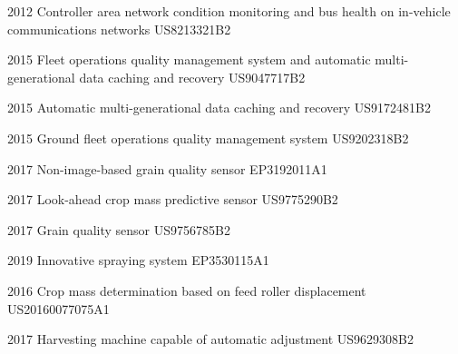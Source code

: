 

\begin{cvpatents}

  \cvpatent
    {2012} %
    {Controller area network condition monitoring and bus health on in-vehicle communications networks} %
    {US8213321B2} %

  \cvpatent
    {2015} %
    {Fleet operations quality management system and automatic multi-generational data caching and recovery} %
    {US9047717B2} %

  \cvpatent
    {2015} %
    {Automatic multi-generational data caching and recovery} %
    {US9172481B2} %

  \cvpatent
    {2015} %
    {Ground fleet operations quality management system} %
    {US9202318B2} %

  \cvpatent
    {2017} %
    {Non-image-based grain quality sensor} %
    {EP3192011A1} %

  \cvpatent
    {2017} %
    {Look-ahead crop mass predictive sensor} %
    {US9775290B2} %

  \cvpatent
    {2017} %
    {Grain quality sensor} %
    {US9756785B2} %

  \cvpatent
    {2019} %
    {Innovative spraying system} %
    {EP3530115A1} %

  \cvpatent
    {2016} %
    {Crop mass determination based on feed roller displacement} %
    {US20160077075A1} %

  \cvpatent
    {2017} %
    {Harvesting machine capable of automatic adjustment} %
    {US9629308B2} %


\end{cvpatents}
